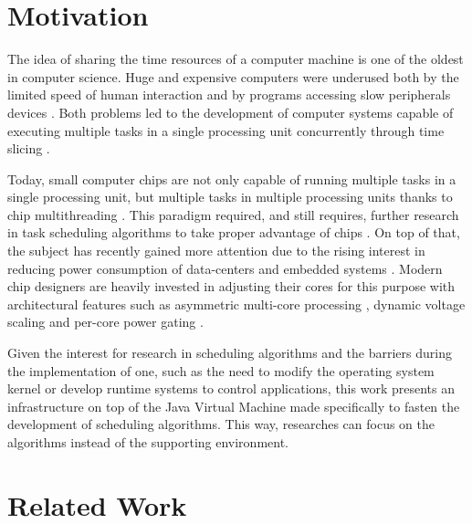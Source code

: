 
\section{Motivation}

The idea of sharing the time resources of a computer machine is one of the oldest in computer science. Huge and expensive computers were underused both by the limited speed of human interaction \cite{strachey1959time} and by programs accessing slow peripherals devices \cite{codd1960multiprogram}. Both problems led to the development of computer systems capable of executing multiple tasks in a single processing unit concurrently through time slicing \cite{corbato1962experimental,codd1959multiprogramming}.

Today, small computer chips are not only capable of running multiple tasks in a single processing unit, but multiple tasks in multiple processing units thanks to chip multithreading \cite{tullsen1995simultaneous,olukotun1996case}. This paradigm required, and still requires, further research in task scheduling algorithms to take proper advantage of chips \cite{fedorova2004chip}. On top of that, the subject has recently gained more attention due to the rising interest in reducing power consumption of data-centers and embedded systems \cite{mittal2014power,mittal2014survey}. Modern chip designers are heavily invested in adjusting their cores for this purpose \cite{greenhalgh2011big,fisher2005power} with architectural features such as asymmetric multi-core processing \cite{kumar2003single}, dynamic voltage scaling \cite{macken1990voltage} and per-core power gating \cite{leverich2009power}.

Given the interest for research in scheduling algorithms and the barriers during the implementation of one, such as the need to modify the operating system kernel or develop runtime systems to control applications, this work presents an infrastructure on top of the Java Virtual Machine made specifically to fasten the development of scheduling algorithms. This way, researches can focus on the algorithms instead of the supporting environment.


\section{Related Work}



